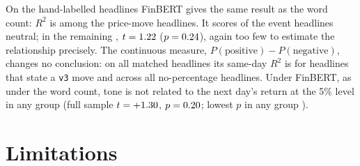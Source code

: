 \documentclass[11pt]{article}
\begin{document}
On the hand-labelled headlines FinBERT gives the same result as the word count: $R^2$ is \fbLabRsqMove{} among the \fbLabNMove{} price-move headlines. It scores \fbLabNEventNeutral{} of the \labNEvent{} event headlines neutral; in the remaining \fbLabNEvent{}, $t=1.22{}$ ($p=0.24{}$), again too few to estimate the relationship precisely. The continuous measure, $P(\text{positive})-P(\text{negative})$, changes no conclusion: on all matched headlines its same-day $R^2$ is \fbContRsqVthree{} for headlines that state a \texttt{v3} move and \fbContRsqNoPct{} across all \fbContNNoPct{} no-percentage headlines. Under FinBERT, as under the word count, tone is not related to the next day's return at the 5\% level in any group (full sample $t=+1.30{}$, $p=0.20{}$; lowest $p$ in any group \fbMinNextP{}).

\section{Limitations}
\label{sec:limits}
\end{document}
